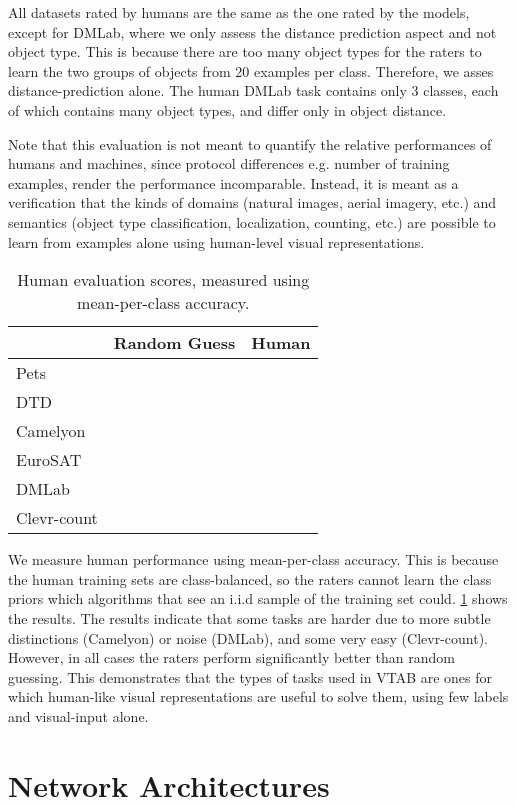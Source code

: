 \documentclass{article}
\begin{document}
All datasets rated by humans are the same as the one rated by the models, except for DMLab, where we only assess the distance prediction aspect and not object type. This is because there are too many object types for the raters to learn the two groups of objects from 20 examples per class. Therefore, we asses distance-prediction alone. The human DMLab task contains only 3 classes, each of which contains many object types, and differ only in object distance.

Note that this evaluation is not meant to quantify the relative performances of humans and machines, since protocol differences e.g. number of training examples, render the performance incomparable. Instead, it is meant as a verification that the kinds of domains (natural images, aerial imagery, etc.) and semantics (object type classification, localization, counting, etc.) are possible to learn from examples alone using human-level visual representations.

\begin{table}[h]
\centering
\begin{tabular}{lrr}
\toprule
& Random Guess & Human \\
\midrule
Pets &  &  \\
DTD  &  &   \\
Camelyon &  &   \\
EuroSAT &  &   \\
DMLab &  &   \\
Clevr-count &   &   \\
\bottomrule
\end{tabular}
\caption{
Human evaluation scores, measured using mean-per-class accuracy.
\label{tab:app-human}}
\end{table}

We measure human performance using mean-per-class accuracy. This is because the human training sets are class-balanced, so the raters cannot learn the class priors which algorithms that see an i.i.d sample of the training set could. \cref{tab:app-human} shows the results. The results indicate that some tasks are harder due to more subtle distinctions (Camelyon) or noise (DMLab), and some very easy (Clevr-count). However, in all cases the raters perform significantly better than random guessing. This demonstrates that the types of tasks used in VTAB are ones for which human-like visual representations are useful to solve them, using few labels and visual-input alone. 



\clearpage
\section{Network Architectures\label{app:architectures}}
\end{document}

